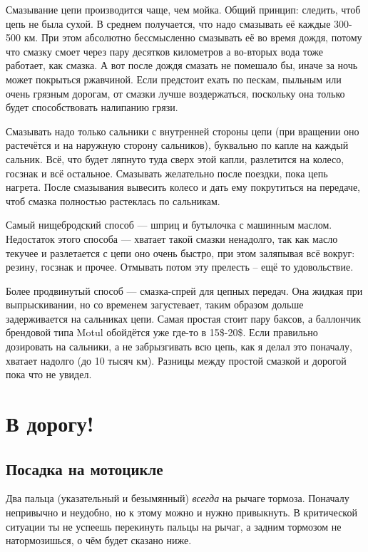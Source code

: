\documentclass[12pt,a4paper]{article}
\begin{document}
Смазывание цепи производится чаще, чем мойка. Общий принцип: следить,
чтоб цепь не была сухой. В среднем получается, что надо смазывать её
каждые 300-500 км. При этом абсолютно бессмысленно смазывать её во
время дождя, потому что смазку смоет через пару десятков километров а
во-вторых вода тоже работает, как смазка. А вот после дождя смазать
не помешало бы, иначе за ночь может покрыться ржавчиной. Если предстоит
ехать по пескам, пыльным или очень грязным дорогам, от смазки лучше
воздержаться, поскольку она только будет способствовать налипанию
грязи.

Смазывать надо только сальники с внутренней стороны
цепи (при вращении оно растечётся и на наружную сторону сальников),
буквально по капле на каждый сальник. Всё, что будет ляпнуто туда
сверх этой капли, разлетится на колесо, госзнак и всё остальное.
Смазывать желательно после поездки, пока цепь нагрета. После смазывания
вывесить колесо и дать ему покрутиться на передаче, чтоб смазка
полностью растеклась по сальникам.

Самый нищебродский способ --- шприц и бутылочка с машинным маслом.
Недостаток этого способа --- хватает такой смазки ненадолго, так как
масло текучее и разлетается с цепи оно очень быстро, при этом заляпывая
всё вокруг: резину, госзнак и прочее. Отмывать потом эту прелесть --
ещё то удовольствие.

Более продвинутый способ --- смазка-спрей для цепных передач. Она
жидкая при выпрыскивании, но со временем загустевает, таким образом
дольше задерживается на сальниках цепи. Самая простая стоит пару баксов,
а баллончик брендовой типа Motul обойдётся уже где-то в 15\$-20\$.
Если правильно дозировать на сальники, а не забрызгивать всю цепь,
как я делал это поначалу, хватает надолго (до 10 тысяч км). Разницы
между простой смазкой и дорогой пока что не увидел.

\section{В дорогу!}

\subsection{Посадка на мотоцикле}

Два пальца (указательный и безымянный) \emph{всегда} на рычаге тормоза.
Поначалу непривычно и неудобно, но к этому можно и нужно привыкнуть.
В критической ситуации ты не успеешь перекинуть пальцы на рычаг, а задним
тормозом не натормозишься, о чём будет сказано ниже.
\end{document}
